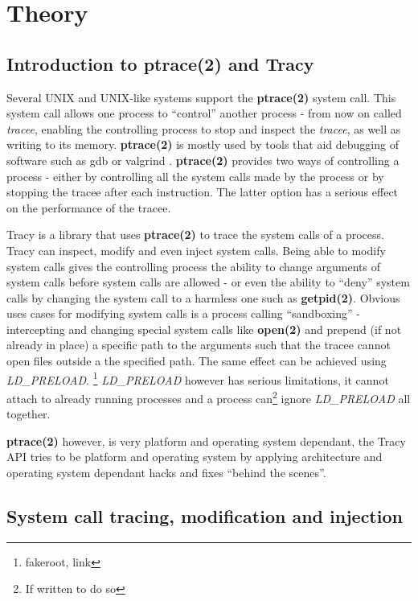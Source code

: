\documentclass[a4paper, twoside, 10pt, twocolumn]{report}
\begin{document}
\chapter{Theory}

\section{Introduction to ptrace(2) and Tracy}

Several UNIX and UNIX-like systems support the \textbf{ptrace(2)} system call.
This system call allows one process to ``control'' another process - from now on
called \textit{tracee}, enabling the controlling process to stop and inspect
the \textit{tracee}, as well as writing to its memory. \textbf{ptrace(2)} is
mostly used by tools that aid debugging of software such as gdb\cite{} or
valgrind \cite{}. \textbf{ptrace(2)} provides two ways of controlling a process
- either by controlling all the system calls made by the process or by stopping
the tracee after each instruction. The latter option has a serious effect on the
performance of the tracee.

Tracy is a library that uses \textbf{ptrace(2)} to trace the system calls of a
process. Tracy can inspect, modify and even inject system calls. Being able to
modify system calls gives the controlling process the ability to change
arguments of system calls before system calls are allowed - or even the ability
to ``deny'' system calls by changing the system call to a harmless one such as
\textbf{getpid(2)}. Obvious uses cases for modifying system calls is a process
calling ``sandboxing'' - intercepting and changing special system calls like
\textbf{open(2)} and prepend (if not already in place) a specific path to the
arguments such that the tracee cannot open files outside a the specified path.
The same effect can be achieved using \textit{LD\_PRELOAD}. \footnote{fakeroot,
link} \textit{LD\_PRELOAD} however has serious limitations, it cannot attach to
already running processes and a process can\footnote{If written to do so} ignore
\textit{LD\_PRELOAD} all together.

\textbf{ptrace(2)} however, is very platform and operating system dependant,
the Tracy API tries to be platform and operating system by applying architecture
and operating system dependant hacks and fixes ``behind the scenes''.

\section{System call tracing, modification and injection}
\end{document}
